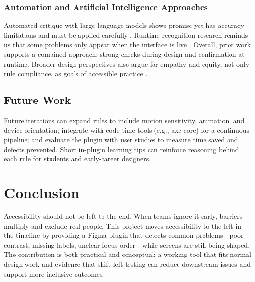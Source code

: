 \documentclass[12pt]{article}
\begin{document}
\subsubsection*{Automation and Artificial Intelligence  Approaches}
Automated critique with large language models shows promise yet has accuracy limitations and must be applied carefully \cite{duan2024mockupfeedback, duan2024uicrit}. Runtime recognition research reminds us that some problems only appear when the interface is live \cite{zhang2021screenrecognition}. Overall, prior work supports a combined approach: strong checks during design and confirmation at runtime. Broader design perspectives also argue for empathy and equity, not only rule compliance, as goals of accessible practice \cite{ginosar2018parametric}.

\subsection*{Future Work}
Future iterations can expand rules to include motion sensitivity, animation, and device orientation; integrate with code-time tools (e.g., axe-core) for a continuous pipeline; and evaluate the plugin with user studies to measure time saved and defects prevented. Short in-plugin learning tips can reinforce reasoning behind each rule for students and early-career designers.

\section{Conclusion}
Accessibility should not be left to the end. When teams ignore it early, barriers multiply and exclude real people. This project moves accessibility to the left in the timeline by providing a Figma plugin that detects common problems—poor contrast, missing labels, unclear focus order—while screens are still being shaped. The contribution is both practical and conceptual: a working tool that fits normal design work and evidence that shift-left testing can reduce downstream issues and support more inclusive outcomes.

\clearpage
{}
{}


\end{document}
